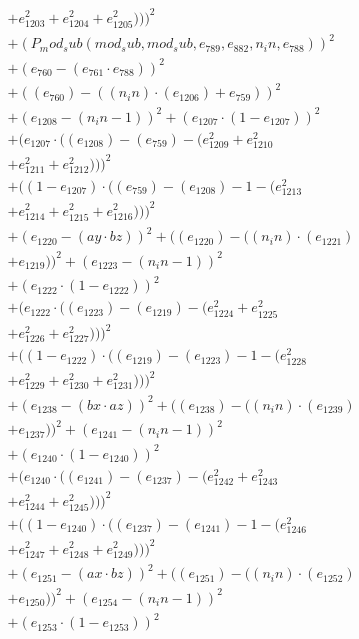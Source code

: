 \documentclass[10pt, a4paper]{article}
\begin{document}
\begin{small}
\begin{align*}
& + e_{1203}^{2} + e_{1204}^{2} + e_{1205}^{2})))^{2} \\
& + (P_mod_sub(mod_sub, mod_sub, e_{789}, e_{882}, n_in, e_{788}))^{2} \\
& + (e_{760} - (e_{761}  \cdot  e_{788}))^{2} \\
& + ((e_{760}) - ((n_in)  \cdot  (e_{1206}) + e_{759}))^{2} \\
& + (e_{1208} - (n_in - 1))^{2} + (e_{1207}  \cdot  (1 - e_{1207}))^{2} \\
& + (e_{1207}  \cdot  ((e_{1208}) - (e_{759}) - (e_{1209}^{2} + e_{1210}^{2} \\
& + e_{1211}^{2} + e_{1212}^{2})))^{2} \\
& + ((1 - e_{1207})  \cdot  ((e_{759}) - (e_{1208}) - 1 - (e_{1213}^{2} \\
& + e_{1214}^{2} + e_{1215}^{2} + e_{1216}^{2})))^{2} \\
& + (e_{1220} - (ay  \cdot  bz))^{2} + ((e_{1220}) - ((n_in)  \cdot  (e_{1221}) \\
& + e_{1219}))^{2} + (e_{1223} - (n_in - 1))^{2} \\
& + (e_{1222}  \cdot  (1 - e_{1222}))^{2} \\
& + (e_{1222}  \cdot  ((e_{1223}) - (e_{1219}) - (e_{1224}^{2} + e_{1225}^{2} \\
& + e_{1226}^{2} + e_{1227}^{2})))^{2} \\
& + ((1 - e_{1222})  \cdot  ((e_{1219}) - (e_{1223}) - 1 - (e_{1228}^{2} \\
& + e_{1229}^{2} + e_{1230}^{2} + e_{1231}^{2})))^{2} \\
& + (e_{1238} - (bx  \cdot  az))^{2} + ((e_{1238}) - ((n_in)  \cdot  (e_{1239}) \\
& + e_{1237}))^{2} + (e_{1241} - (n_in - 1))^{2} \\
& + (e_{1240}  \cdot  (1 - e_{1240}))^{2} \\
& + (e_{1240}  \cdot  ((e_{1241}) - (e_{1237}) - (e_{1242}^{2} + e_{1243}^{2} \\
& + e_{1244}^{2} + e_{1245}^{2})))^{2} \\
& + ((1 - e_{1240})  \cdot  ((e_{1237}) - (e_{1241}) - 1 - (e_{1246}^{2} \\
& + e_{1247}^{2} + e_{1248}^{2} + e_{1249}^{2})))^{2} \\
& + (e_{1251} - (ax  \cdot  bz))^{2} + ((e_{1251}) - ((n_in)  \cdot  (e_{1252}) \\
& + e_{1250}))^{2} + (e_{1254} - (n_in - 1))^{2} \\
& + (e_{1253}  \cdot  (1 - e_{1253}))^{2} \\

\end{align*}
\end{small}
\end{document}
